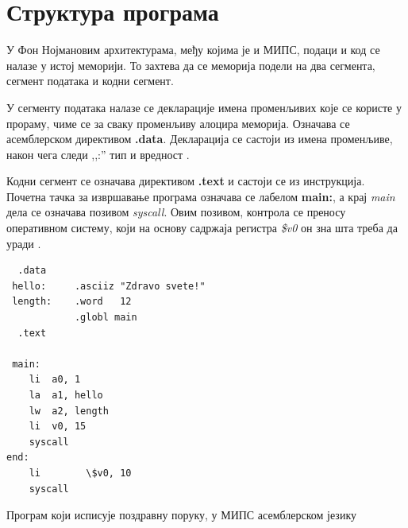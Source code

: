 \documentclass[12pt,oneside]{memoir}
\begin{document}
\section{Структура програма}
У Фон Нојмановим архитектурама, међу којима је и МИПС, подаци и код се налазе у истој меморији. То захтева да се меморија подели на два сегмента, сегмент података и кодни сегмент.

У сегменту података налазе се декларације имена променљивих које се користе у прораму, чиме се за сваку променљиву алоцира меморија. Означава се асемблерском директивом \textbf{.data}. Декларација се састоји из имена променљиве, након чега следи ,,:'' тип и вредност \cite{struktura}.

Кодни сегмент се означава директивом \textbf{.text} и састоји се из инструкција. Почетна тачка за извршавање програма означава се лабелом \textbf{main:}, а крај \textit{main} дела се означава позивом \textit{syscall}. Овим позивом, контрола се преносу оперативном систему, који на основу садржаја регистра \textit{\$v0} он зна шта треба да уради \cite{struktura}.

\begin{listing}
\begin{verbatim}
  .data
 hello:     .asciiz "Zdravo svete!"
 length:    .word   12
            .globl main
  .text

 main:
    li  a0, 1
    la  a1, hello
    lw  a2, length
    li  v0, 15
    syscall
end:
    li        \$v0, 10
    syscall
\end{verbatim}
\caption{Програм који исписује поздравну поруку, у МИПС асемблерском језику}
\label{asmkod}
\end{listing}
\end{document}
